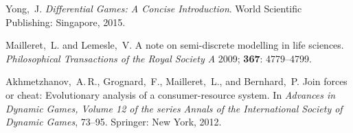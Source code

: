 \documentclass[a4paper,12pt]{article}
\begin{document}
\begin{thebibliography}{}
Yong,~J.
{\it Differential Games{\rm :} A Concise Introduction}.
World Scientific Publishing: Singapore, 2015.

Mailleret,~L. and Lemesle,~V.
A note on semi-discrete modelling in life sciences.
{\it Philosophical Transactions of the Royal Society A} 2009; {\bf 367}: 4779--4799.

Akhmetzhanov,~A.\,R., Grognard,~F., Mailleret,~L., and Bernhard,~P.
Join forces or cheat: Evolutionary analysis of a consumer-resource system.
In {\it Advances in Dynamic Games{\rm ,}
Volume {\rm 12} of the series Annals of the International Society of Dynamic Games}, 73--95.
Springer: New York, 2012.

\end{thebibliography}
\end{document}
